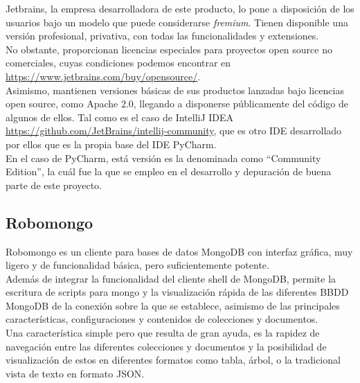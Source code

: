 Jetbrains, la empresa desarrolladora de este producto, lo pone a disposición de los usuarios bajo un modelo que puede considerarse \textit{fremium}. Tienen disponible una versión profesional, privativa, con todas las funcionalidades y extensiones.\\


No obstante, proporcionan licencias especiales para proyectos open source no comerciales, cuyas condiciones podemos encontrar en \space \url{https://www.jetbrains.com/buy/opensource/}.\\


Asimismo, mantienen versiones básicas de sus productos lanzadas bajo licencias open source, como Apache 2.0, llegando a disponerse públicamente del código de algunos de ellos. Tal como es el caso de IntelliJ IDEA \space \url{https://github.com/JetBrains/intellij-community}, que es otro IDE desarrollado por ellos que es la propia base del IDE PyCharm.\\


En el caso de PyCharm, está versión es la denominada como ``Community Edition'', la cuál fue la que se empleo en el desarrollo y depuración de buena parte de este proyecto.\\


\subsection{Robomongo}
\label{subsec:robomongo}

Robomongo es un cliente para bases de datos MongoDB con interfaz gráfica, muy ligero y de funcionalidad básica, pero suficientemente potente.\\


Además de integrar la funcionalidad del cliente shell de MongoDB, permite la escritura de scripts para mongo y la visualización rápida de las diferentes BBDD MongoDB de la conexión sobre la que se establece, asimismo de las principales características, configuraciones y contenidos de colecciones y documentos.\\


Una característica simple pero que resulta de gran ayuda, es la rapidez de navegación entre las diferentes colecciones y documentos y la posibilidad de visualización de estos en diferentes formatos como tabla, árbol, o la tradicional vista de texto en formato JSON.\\


